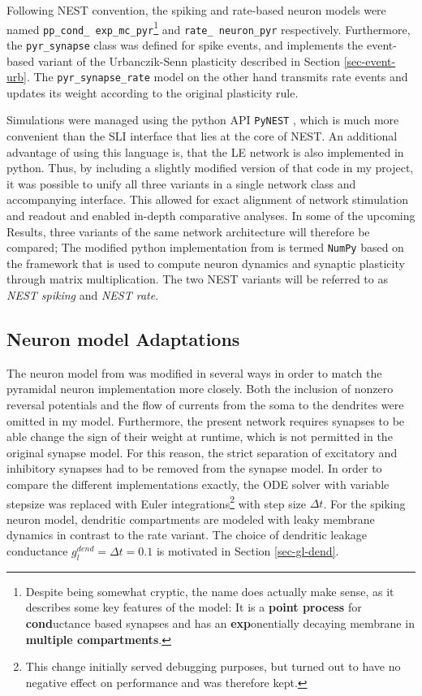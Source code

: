Following NEST convention, the spiking and rate-based neuron models were named \texttt{pp\_\allowbreak cond\_\allowbreak
  exp\_\allowbreak mc\_\allowbreak pyr}\footnote{Despite being somewhat cryptic, the name does actually make sense, as
  it describes some key features of the model: It is a \textbf{point process} for \textbf{cond}uctance based synapses
  and has an \textbf{exp}onentially decaying membrane in \textbf{multiple compartments}.} and \texttt{rate\_\allowbreak
  neuron\_\allowbreak pyr} respectively. Furthermore, the \texttt{pyr\_\allowbreak synapse} class was defined for spike
events, and implements the event-based variant of the Urbanczik-Senn plasticity described in Section
\ref{sec-event-urb}. The \texttt{pyr\_\allowbreak synapse\_\allowbreak rate} model on the other hand transmits rate
events and updates its weight according to the original plasticity rule.

Simulations were managed using the python API \texttt{PyNEST} \citep{Eppler2009}, which is much more convenient than the
SLI interface that lies at the core of NEST. An additional advantage of using this language is, that the LE network  is
also implemented in python. Thus, by including a slightly modified version of that code in my project, it was possible
to unify all three variants in a single network class and accompanying interface. This allowed for exact alignment of
network stimulation and readout and enabled in-depth comparative analyses. In some of the upcoming Results, three
variants of the same network architecture will therefore be compared; The modified python implementation from
\citep{Haider2021} is termed \texttt{NumPy} based on the framework that is used to compute neuron dynamics and synaptic
plasticity through matrix multiplication. The two NEST variants will be referred to as \textit{NEST spiking} and
\textit{NEST rate}.

\subsection{Neuron model Adaptations}

The neuron model from \citep{Stapmanns2021} was modified in several ways in order to match the pyramidal neuron
implementation more closely. Both the inclusion of nonzero reversal potentials and the flow of currents from the soma to
the dendrites were omitted in my model. Furthermore, the present network requires synapses to be able change the sign of
their weight at runtime, which is not permitted in the original synapse model. For this reason, the strict separation of
excitatory and inhibitory synapses had to be removed from the synapse model. In order to compare the different
implementations exactly, the ODE solver with variable stepsize was replaced with Euler integrations\footnote{This change
  initially served debugging purposes, but turned out to have no negative effect on performance and was therefore kept.}
with step size $\Delta t$. For the spiking neuron model, dendritic compartments are modeled with leaky membrane dynamics
in contrast to the rate variant. The choice of dendritic leakage conductance $g_l^{dend}=\Delta t=0.1$ is motivated in
Section \ref{sec-gl-dend}.

